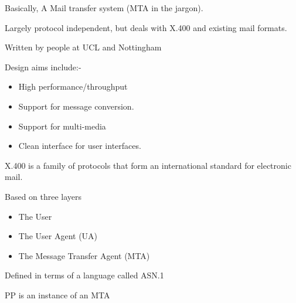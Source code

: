 \begin{bwslide}
\begin{nrtc}
\item	Basically, A Mail transfer system (MTA in the jargon).

\item	Largely protocol independent, but deals with X.400
	and existing mail formats.

\item	Written by people at UCL and Nottingham

\item	Design aims include:-
	\begin{itemize}

	\item	High performance/throughput
	\item	Support for message conversion.
	\item	Support for multi-media
	\item	Clean interface for user interfaces.
	\end{itemize}

\end{nrtc}
\end{bwslide}

\begin{bwslide}
\begin{nrtc}
\item	X.400 is a family of protocols that form an international
standard for electronic mail.

\item	Based on three layers
	\begin{itemize}
	\item	The User
	\item	The User Agent (UA)
	\item	The Message Transfer Agent (MTA)
	\end{itemize}
\item	Defined in terms of a language called ASN.1

\item	PP is an instance of an MTA
\end{nrtc}
\end{bwslide}


